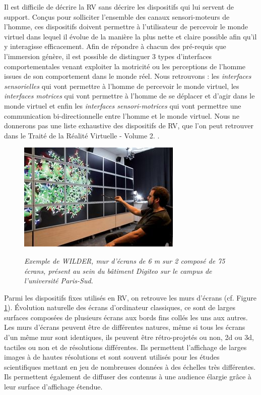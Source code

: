  \label{dispositifs_RV}


Il est difficile de décrire la RV sans décrire les dispositifs qui lui servent de support. Conçus pour solliciter l'ensemble des canaux sensori-moteurs de l'homme, ces dispositifs doivent permettre à l'utilisateur de percevoir le monde virtuel dans lequel il évolue de la manière la plus nette et claire possible afin qu'il y interagisse efficacement.
Afin de répondre à chacun des pré-requis que l'immersion génère, il est possible de distinguer 3 types d'interfaces comportementales venant exploiter la motricité ou les perceptions de l'homme issues de son comportement dans le monde réel.
Nous retrouvons : les \textit{interfaces sensorielles} qui vont permettre à l'homme de percevoir le monde virtuel, les \textit{interfaces motrices} qui vont permettre à l'homme de se déplacer et d'agir dans le monde virtuel et enfin les \textit{interfaces sensori-motrices} qui vont permettre une communication bi-directionnelle entre l'homme et le monde virtuel.
Nous ne donnerons pas une liste exhaustive des dispositifs de RV, que l'on peut retrouver dans le Traité de la Réalité Virtuelle - Volume 2. \cite{fuchs2006traite}.

\begin{figure}
  \centering
  {\includegraphics[width=.65\linewidth]{./figures/ch2/screen_wall}}
    \caption[Mur d'écrans WILDER.]{{\it Exemple de WILDER, mur d'écrans de 6 m sur 2 composé de 75 écrans, présent au sein du bâtiment Digiteo sur le campus de l'université Paris-Sud.}}
  \label{Fig:screen_wall}
  \hspace{0.3cm}
\end{figure}

Parmi les dispositifs fixes utilisés en RV, on retrouve les murs d'écrans (cf. Figure \ref{Fig:screen_wall}). Évolution naturelle des écrans d'ordinateur classiques, ce sont de larges surfaces composées de plusieurs écrans aux bords fins collés les uns aux autres. Les murs d'écrans peuvent être de différentes natures, même si tous les écrans d'un même mur sont identiques, ils peuvent être rétro-projetés ou non, 2d ou 3d, tactiles ou non et de résolutions différentes. Ils permettent l'affichage de larges images à de hautes résolutions et sont souvent utilisés pour les études scientifiques mettant en jeu de nombreuses données à des échelles très différentes. Ils permettent également de diffuser des contenus à une audience élargie grâce à leur surface d'affichage étendue.

